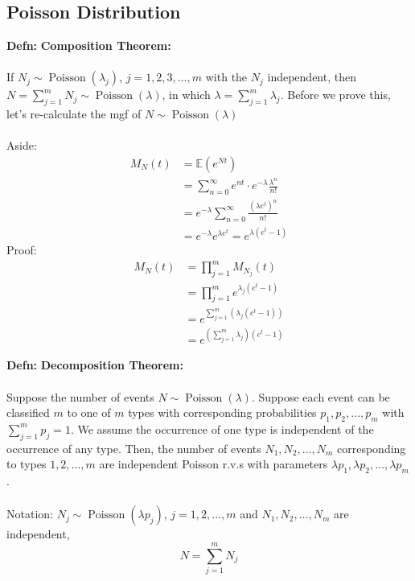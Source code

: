 \documentclass[a4paper]{article}
\newcommand{\n}{\hfill\break}
\newcommand{\defn}[1]{\par\noindent\settowidth{\hangindent}{\textbf{Defn: }}\textbf{Defn: }#1\n}
\newcommand{\Avg}{\mathbb{E}}
\newcommand{\E}{\Avg}
\DeclareMathOperator{\Poiss}{\text{Poisson}}
\begin{document}
\subsection*{Poisson Distribution}
\defn{
    \textbf{Composition Theorem:} 
    \\\\
    If $N_j\sim\Poiss(\lambda_j)$, $j=1,2,3,\dots, m$ with the $N_j$ independent, then $N=\sum^m_{j=1}N_j\sim\Poiss(\lambda)$, in which $\lambda=\sum^m_{j=1}\lambda_j$.
    Before we prove this, let's re-calculate the mgf of $N\sim\Poiss(\lambda)$
    \\\\
    Aside:
    \begin{align*}
        M_N(t)&=\E(e^{Nt}) \\
        &=\sum^\infty_{n=0}e^{nt}\cdot e^{-\lambda}\frac{\lambda^n}{n!} \\
        &=e^{-\lambda}\sum^\infty_{n=0}\frac{(\lambda e^t)^n}{n!} \\
        &=e^{-\lambda}e^{\lambda e^t}=e^{\lambda(e^t-1)}
    \end{align*}
    Proof:
    \begin{align*}
        M_N(t)&=\prod^m_{j=1}M_{N_j}(t) \\
        &=\prod^m_{j=1}e^{\lambda_j(e^t-1)} \\
        &=e^{\sum^m_{j=1}(\lambda_j(e^t-1))} \\
        &=e^{(\sum_{j=1}^m\lambda_j)(e^t-1)}
    \end{align*}
}

\defn{
    \textbf{Decomposition Theorem:} 
    \\\\
    Suppose the number of events $N\sim\Poiss(\lambda)$. Suppose each event can be classified $m$ to one of $m$ types with corresponding probabilities $p_1, p_2, \dots, p_m$ with $\sum^m_{j=1}p_j=1$. We assume the occurrence of one type is independent of the occurrence of any type. Then, the number of events $N_1, N_2, \dots, N_m$ corresponding to types $1, 2, \dots, m$ are independent Poisson r.v.s with parameters $\lambda p_1, \lambda p_2, \dots, \lambda p_m$.
    \\\\
    Notation: $N_j\sim\Poiss(\lambda p_j)$, $j=1,2,\dots,m$ and $N_1, N_2, \dots, N_m$ are independent, 
    \[N=\sum^m_{j=1}N_j\]
}
\end{document}
